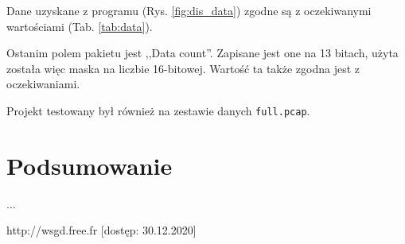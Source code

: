 \documentclass[a4paper, 12pt, twoside, openright]{article}
\begin{document}
Dane uzyskane z programu (Rys. \ref{fig:dis_data}) zgodne są z oczekiwanymi wartościami (Tab. \ref{tab:data}).

Ostanim polem pakietu jest ,,Data count''. Zapisane jest one na 13 bitach, użyta została więc maska na liczbie 16-bitowej.
Wartość ta także zgodna jest z oczekiwaniami.

Projekt testowany był również na zestawie danych \texttt{full.pcap}.

\newpage
\section{Podsumowanie}

...




\newpage

\begin{thebibliography}{99}

		http://wsgd.free.fr [dostęp: 30.12.2020]


\end{thebibliography}


\vspace{85mm}
\end{document}
